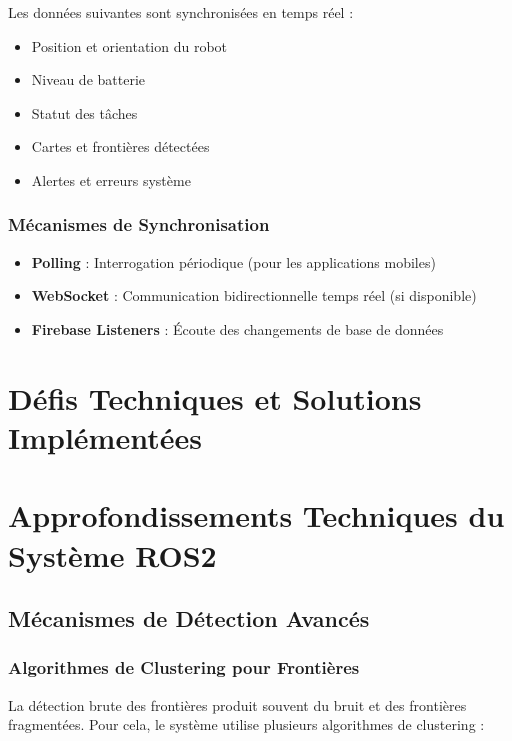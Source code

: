 \documentclass[12pt,a4paper,oneside]{report}
\begin{document}
Les données suivantes sont synchronisées en temps réel :

\begin{itemize}
  \item Position et orientation du robot
  \item Niveau de batterie
  \item Statut des tâches
  \item Cartes et frontières détectées
  \item Alertes et erreurs système
\end{itemize}

\subsection{Mécanismes de Synchronisation}

\begin{itemize}
  \item \textbf{Polling} : Interrogation périodique (pour les applications mobiles)
  \item \textbf{WebSocket} : Communication bidirectionnelle temps réel (si disponible)
  \item \textbf{Firebase Listeners} : Écoute des changements de base de données
\end{itemize}

\newpage

\chapter{Défis Techniques et Solutions Implémentées}

\chapter{Approfondissements Techniques du Système ROS2}

\section{Mécanismes de Détection Avancés}

\subsection{Algorithmes de Clustering pour Frontières}

La détection brute des frontières produit souvent du bruit et des frontières fragmentées. Pour cela, le système utilise plusieurs algorithmes de clustering :
\end{document}
